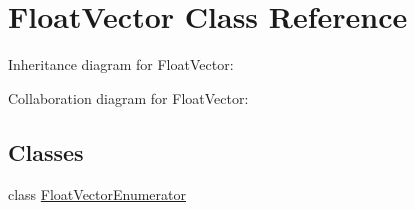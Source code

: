 \hypertarget{class_float_vector}{\section{Float\+Vector Class Reference}
\label{class_float_vector}
}


Inheritance diagram for Float\+Vector\+:


Collaboration diagram for Float\+Vector\+:
\subsection*{Classes}
\begin{DoxyCompactItemize}
\item 
class \hyperlink{class_float_vector_1_1_float_vector_enumerator}{Float\+Vector\+Enumerator}
\end{DoxyCompactItemize}
